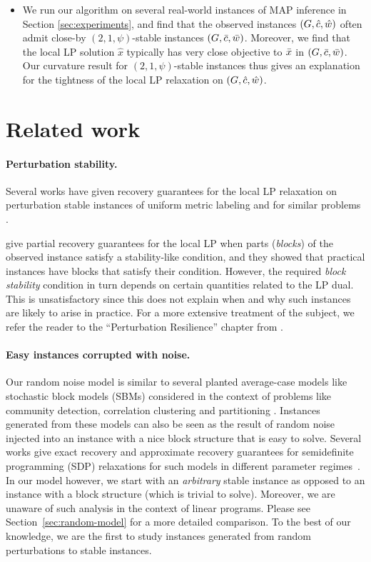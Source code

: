 \begin{itemize}
    \item We run our algorithm on several real-world instances of MAP inference in Section \ref{sec:experiments}, and find that the observed instances $(G,\hat{c},\hat{w})$ often admit close-by $(2,1,\psi)$-stable instances $(G,\bar{c},\bar{w})$. 
    Moreover, we find that the local LP solution $\hat{x}$ typically has very close objective to $\bar{x}$ in $(G,\bar{c},\bar{w})$.
    Our curvature result for $(2,1,\psi)$-stable instances thus gives an explanation for the tightness of the local LP relaxation on $(G,\hat{c},\hat{w})$.
\end{itemize}

\section{Related work}
\label{sec:related}
\paragraph{Perturbation stability.}

Several works have given recovery guarantees for the local LP relaxation on perturbation stable instances of uniform metric labeling \citep{LanSonVij18, LanSonVij19} and for similar problems \citep{makarychev2014bilu, AngMakMak17}.

\citet{LanSonVij19} give partial recovery guarantees for the local LP when parts (\textit{blocks}) of the observed instance satisfy a stability-like condition, and they showed that practical instances have blocks that satisfy their condition. However, the required {\em block stability} condition in turn depends on certain quantities related to the LP dual. This is unsatisfactory since this does not explain when and why such instances are likely to arise in practice.
For a more extensive treatment of the subject, we refer the reader to the ``Perturbation Resilience'' chapter from \citet{roughgarden_2021}.

\paragraph{Easy instances corrupted with noise.}
Our random noise model is similar to several planted average-case models like stochastic block models (SBMs) considered in the context of problems like community detection, correlation clustering and partitioning \citep[see e.g.,][]{Mcsherry,Abbesurvey, GRSY15}. Instances generated from these models can also be seen as the result of random noise injected into an instance with a nice block structure that is easy to solve. 
Several works give exact recovery and approximate recovery guarantees for semidefinite programming (SDP) relaxations for such models in different parameter regimes~\cite{Abbesurvey,guedon2016community}. 
In our model however, we start with an {\em arbitrary} stable instance as opposed to an instance with a block structure (which is trivial to solve). 
Moreover, we are unaware of such analysis in the context of linear programs.
Please see Section~\ref{sec:random-model} for a more detailed comparison. 
To the best of our knowledge, we are the first to study instances generated from random perturbations to stable instances.

